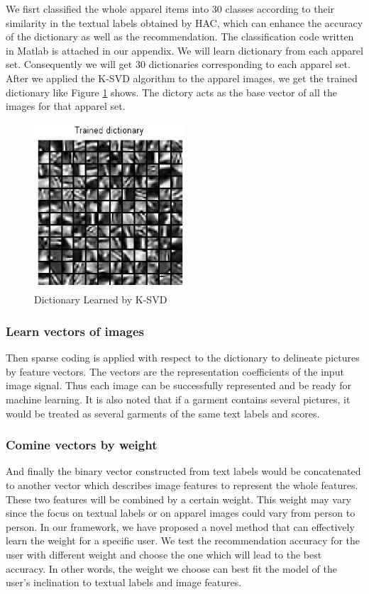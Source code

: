 We fisrt classified the whole apparel items into 30 classes according to their similarity in the textual labels obtained by HAC, which can enhance the accuracy of the dictionary as well as the recommendation. The classification code written in Matlab is attached in our appendix. We will learn dictionary from each apparel set. Consequently we will get 30 dictionaries corresponding to each apparel set. After we applied the K-SVD algorithm to the apparel images, we get the trained dictionary like Figure \ref{fig:dict} shows. The dictory acts as the base vector of all the images for that apparel set.


\begin{figure}
  \centering
  \includegraphics[width=0.5\textwidth]{Trained_dic}
  \caption{Dictionary Learned by K-SVD}
  \label{fig:dict}
\end{figure}


\subsubsection{Learn vectors of images}
Then sparse coding is applied with respect to the dictionary to delineate pictures by feature vectors. The vectors are the representation coefficients of the input image signal. Thus each image can be successfully represented and be ready for machine learning. It is also noted that if a garment contains several pictures, it would be treated as several garments of the same text labels and scores.
  
\subsubsection{Comine vectors by weight}
And finally the binary vector constructed from text labels would be concatenated to another vector which describes image features to represent the whole features. These two features will be combined by a certain weight. This weight may vary since the focus on textual labels or on apparel images could vary from person to person. In our framework, we have proposed a novel method that can effectively learn the weight for a specific user. We test the recommendation
accuracy for the user with different weight and choose the one which will lead to the best accuracy. In other words, the weight we choose can best fit the model of the user's inclination to textual labels and image features.

